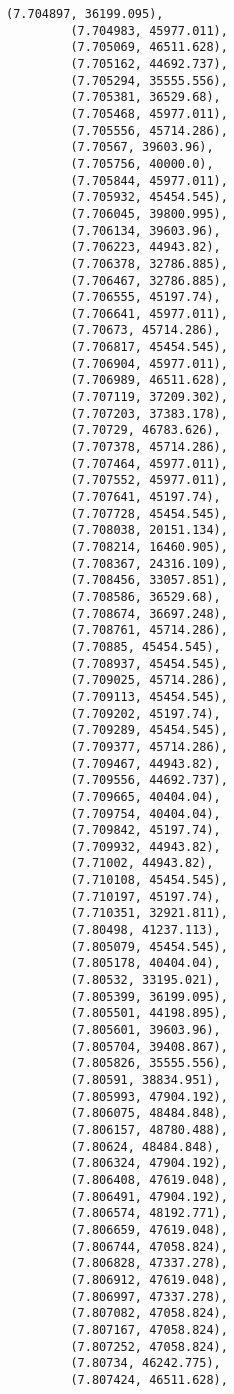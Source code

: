 \documentclass[11pt]{article}
\begin{document}
\begin{Verbatim}[commandchars=\\\{\}]
         (7.704897, 36199.095),
         (7.704983, 45977.011),
         (7.705069, 46511.628),
         (7.705162, 44692.737),
         (7.705294, 35555.556),
         (7.705381, 36529.68),
         (7.705468, 45977.011),
         (7.705556, 45714.286),
         (7.70567, 39603.96),
         (7.705756, 40000.0),
         (7.705844, 45977.011),
         (7.705932, 45454.545),
         (7.706045, 39800.995),
         (7.706134, 39603.96),
         (7.706223, 44943.82),
         (7.706378, 32786.885),
         (7.706467, 32786.885),
         (7.706555, 45197.74),
         (7.706641, 45977.011),
         (7.70673, 45714.286),
         (7.706817, 45454.545),
         (7.706904, 45977.011),
         (7.706989, 46511.628),
         (7.707119, 37209.302),
         (7.707203, 37383.178),
         (7.70729, 46783.626),
         (7.707378, 45714.286),
         (7.707464, 45977.011),
         (7.707552, 45977.011),
         (7.707641, 45197.74),
         (7.707728, 45454.545),
         (7.708038, 20151.134),
         (7.708214, 16460.905),
         (7.708367, 24316.109),
         (7.708456, 33057.851),
         (7.708586, 36529.68),
         (7.708674, 36697.248),
         (7.708761, 45714.286),
         (7.70885, 45454.545),
         (7.708937, 45454.545),
         (7.709025, 45714.286),
         (7.709113, 45454.545),
         (7.709202, 45197.74),
         (7.709289, 45454.545),
         (7.709377, 45714.286),
         (7.709467, 44943.82),
         (7.709556, 44692.737),
         (7.709665, 40404.04),
         (7.709754, 40404.04),
         (7.709842, 45197.74),
         (7.709932, 44943.82),
         (7.71002, 44943.82),
         (7.710108, 45454.545),
         (7.710197, 45197.74),
         (7.710351, 32921.811),
         (7.80498, 41237.113),
         (7.805079, 45454.545),
         (7.805178, 40404.04),
         (7.80532, 33195.021),
         (7.805399, 36199.095),
         (7.805501, 44198.895),
         (7.805601, 39603.96),
         (7.805704, 39408.867),
         (7.805826, 35555.556),
         (7.80591, 38834.951),
         (7.805993, 47904.192),
         (7.806075, 48484.848),
         (7.806157, 48780.488),
         (7.80624, 48484.848),
         (7.806324, 47904.192),
         (7.806408, 47619.048),
         (7.806491, 47904.192),
         (7.806574, 48192.771),
         (7.806659, 47619.048),
         (7.806744, 47058.824),
         (7.806828, 47337.278),
         (7.806912, 47619.048),
         (7.806997, 47337.278),
         (7.807082, 47058.824),
         (7.807167, 47058.824),
         (7.807252, 47058.824),
         (7.80734, 46242.775),
         (7.807424, 46511.628),

\end{Verbatim}
\end{document}
